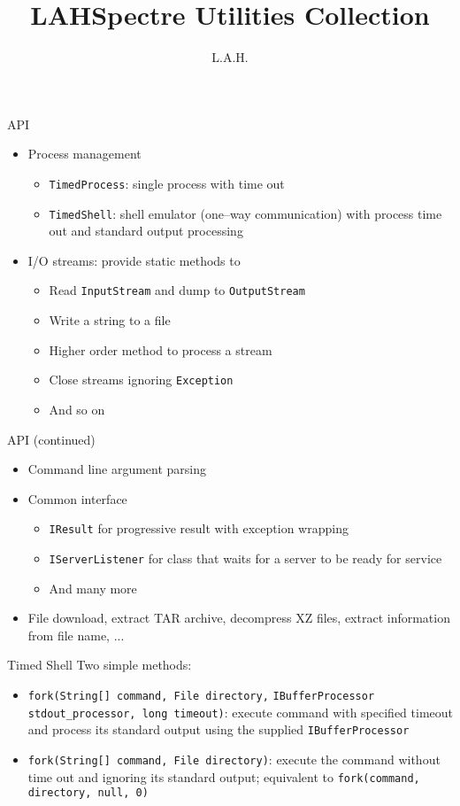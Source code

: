\documentclass{beamer}
\title{LAHSpectre Utilities Collection}
\author{L.A.H.}
\begin{document}
\begin{frame}
\titlepage
\end{frame}

\begin{frame}[fragile]{API}
\begin{itemize}
\item Process management
\begin{itemize}
\item \verb/TimedProcess/: single process with time out
\item \verb/TimedShell/: shell emulator (one--way communication) with process time out and standard output processing
\end{itemize}
\item I/O streams: provide static methods to
\begin{itemize}
\item Read \verb/InputStream/ and dump to \verb/OutputStream/
\item Write a string to a file
\item Higher order method to process a stream
\item Close streams ignoring \verb/Exception/
\item And so on
\end{itemize}
\end{itemize}
\end{frame}

\begin{frame}[fragile]{API (continued)}
\begin{itemize}
\item Command line argument parsing
\item Common interface
\begin{itemize}
\item \verb/IResult/ for progressive result with exception wrapping 
\item \verb/IServerListener/ for class that waits for a server to be ready for service
\item And many more
\end{itemize}
\item File download, extract TAR archive, decompress XZ files, extract information from file name, ...
\end{itemize}
\end{frame}

\begin{frame}[fragile]{Timed Shell}
Two simple methods:
\begin{itemize}
\item \verb/fork(String[] command, File directory,/ \verb/IBufferProcessor stdout_processor, long timeout)/: execute command with specified timeout and process its standard output using the supplied \verb/IBufferProcessor/
\item \verb/fork(String[] command, File directory)/: execute the command without time out and ignoring its standard output; equivalent to \verb/fork(command, directory, null, 0)/
\end{itemize}
\end{frame}
\end{document}
